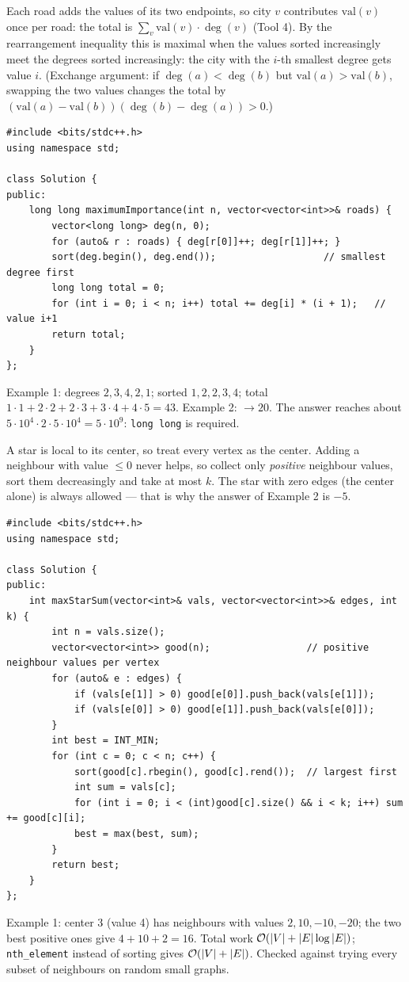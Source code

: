 \begin{solutionbox}
Each road adds the values of its two endpoints, so city $v$ contributes $\text{val}(v)$ once per road: the total is $\sum_v \text{val}(v)\cdot\deg(v)$ (Tool 4). By the rearrangement inequality this is maximal when the values sorted increasingly meet the degrees sorted increasingly: the city with the $i$-th smallest degree gets value $i$. (Exchange argument: if $\deg(a) < \deg(b)$ but $\text{val}(a) > \text{val}(b)$, swapping the two values changes the total by $(\text{val}(a)-\text{val}(b))(\deg(b)-\deg(a)) > 0$.)
\begin{lstlisting}[style=cpp]
#include <bits/stdc++.h>
using namespace std;

class Solution {
public:
    long long maximumImportance(int n, vector<vector<int>>& roads) {
        vector<long long> deg(n, 0);
        for (auto& r : roads) { deg[r[0]]++; deg[r[1]]++; }
        sort(deg.begin(), deg.end());                   // smallest degree first
        long long total = 0;
        for (int i = 0; i < n; i++) total += deg[i] * (i + 1);   // value i+1
        return total;
    }
};
\end{lstlisting}
Example 1: degrees $2,3,4,2,1$; sorted $1,2,2,3,4$; total $1\cdot1 + 2\cdot2 + 2\cdot3 + 3\cdot4 + 4\cdot5 = 43$. Example 2: $\to 20$. The answer reaches about $5\cdot10^4 \cdot 2 \cdot 5\cdot10^4 = 5\cdot10^9$: \texttt{long long} is required.
\end{solutionbox}

\begin{solutionbox}
A star is local to its center, so treat every vertex as the center. Adding a neighbour with value $\le 0$ never helps, so collect only \emph{positive} neighbour values, sort them decreasingly and take at most $k$. The star with zero edges (the center alone) is always allowed --- that is why the answer of Example 2 is $-5$.
\begin{lstlisting}[style=cpp]
#include <bits/stdc++.h>
using namespace std;

class Solution {
public:
    int maxStarSum(vector<int>& vals, vector<vector<int>>& edges, int k) {
        int n = vals.size();
        vector<vector<int>> good(n);                 // positive neighbour values per vertex
        for (auto& e : edges) {
            if (vals[e[1]] > 0) good[e[0]].push_back(vals[e[1]]);
            if (vals[e[0]] > 0) good[e[1]].push_back(vals[e[0]]);
        }
        int best = INT_MIN;
        for (int c = 0; c < n; c++) {
            sort(good[c].rbegin(), good[c].rend());  // largest first
            int sum = vals[c];
            for (int i = 0; i < (int)good[c].size() && i < k; i++) sum += good[c][i];
            best = max(best, sum);
        }
        return best;
    }
};
\end{lstlisting}
Example 1: center 3 (value 4) has neighbours with values $2, 10, -10, -20$; the two best positive ones give $4 + 10 + 2 = 16$. Total work $\mathcal{O}(|V| + |E|\log|E|)$; \texttt{nth\_element} instead of sorting gives $\mathcal{O}(|V|+|E|)$. Checked against trying every subset of neighbours on random small graphs.
\end{solutionbox}


